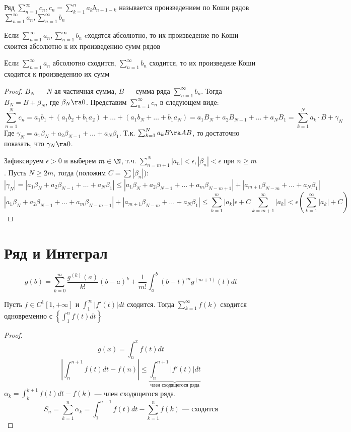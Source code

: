 \begin{definition}
    Ряд \(\sum_{n = 1}^\infty c_n, c_n = \sum_{k = 1}^na_kb_{n + 1 - k}\) называется произведением по Коши рядов \(\sum_{n = 1}^\infty a_n, \sum_{n = 1}^\infty b_n\)
\end{definition}

\begin{corollary}
    Если \(\sum_{n = 1}^\infty a_n, \sum_{n = 1}^\infty b_n\) cходятся абсолютно, то их произведение по Коши схоится абсолютно к их произведению сумм рядов
\end{corollary}

\begin{theorem}[Мертенс]
    Если \(\sum_{n = 1}^\infty a_n\) абсолютно сходится, \(\sum_{n = 1}^\infty b_n\) сходится, то их произведеие Коши сходится к произведению их сумм
\end{theorem}
\begin{proof}
    \(B_N\) --- \(N\)-ая частичная сумма, \(B\) --- сумма ряда \(\sum_{n = 1}^\infty b_n\). Тогда \(B_N = B + \beta_N\), где \(\beta_N \ra 0\). Представим \(\sum_{n = 1}^\infty c_n\) в следующем виде:
    \[\sum_{n = 1}^N c_n = a_1b_1 + (a_1b_2 + b_1a_2) + \dots + (a_1b_N + \dots + b_1a_N) = a_1B_N + a_2B_{N - 1} + \dots + a_NB_1 = \sum_{k = 1}^N a_k \cdot B + \gamma_N\]
    Где \(\gamma_N = a_1\beta_N + a_2\beta_{N - 1} + \dots + a_N\beta_1\). Т.к. \(\sum_{k = 1}^N a_kB \ra AB\), то достаточно показать, что \(\gamma_N \ra 0\). 

    Зафиксируем \(\epsilon > 0\) и выберем \(m \in \N\), т.ч. \(\sum_{n = m + 1}^N|a_n| < \epsilon, |\beta_n| < \epsilon\) при \(n \ge m\). Пусть \(N \ge 2m\), тогда (положим \(C = \sum |\beta_n|\)):
    \[|\gamma_N| = |a_1\beta_N + a_2\beta_{N - 1} + \dots + a_N\beta_1| \le |a_1\beta_N + a_2\beta_{N - 1} + \dots + a_m\beta_{N - m + 1}|  + |a_{m + 1}\beta_{N - m} + \dots + a_N\beta_1|\]
    \[|a_1\beta_N + a_2\beta_{N - 1} + \dots + a_m\beta_{N - m + 1}|  + |a_{m + 1}\beta_{N - m} + \dots + a_N\beta_1| \le \sum_{k = 1}^m |a_k|\epsilon + C \sum_{k = m + 1}^\infty |a_k| < \epsilon\left(\sum_{k = 1}^\infty|a_k| + C\right)\]
\end{proof}

\section{Ряд и Интеграл}
\[g(b) = \sum_{k = 0}^m \frac{g^{(k)}(a)}{k!}(b - a)^k + \frac{1}{m!}\int_a^b(b - t)^mg^{(m + 1)}(t)dt\]

Пусть \(f \in C^1[1, +\infty]\) и \(\int_1^\infty|f'(t)|dt\) сходится. Тогда \(\sum_{k = 1}^\infty f(k)\) сходится одновременно с \(\left\{\int_1^n f(t)dt\right\}\)

\begin{proof}
    \[g(x) = \int_n^xf(t)dt \]
    \[\left|\int_n^{n + 1}f(t)dt - f(n)\right| \le \underbrace{\int_n^{n + 1}|f'(t)|dt}_{\text{член сходящегося ряда}}\]
    \(\alpha_k = \int_k^{k + 1}f(t)dt - f(k)\) --- член сходящегося ряда.
    \[S_n = \sum_{k = 1}^n \alpha_k = \int_1^{n + 1}f(t)dt - \sum_{k = 1}^nf(k) \text{ --- сходится}\]
\end{proof}